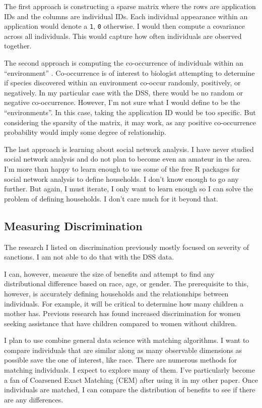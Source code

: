\documentclass[12pt,letterpaperpaper,]{book}
\begin{document}
The first approach is constructing a sparse matrix where the rows are
application IDs and the columns are individual IDs. Each individual
appearance within an application would denote a \texttt{1}, \texttt{0}
otherwise. I would then compute a covariance across all individuals.
This would capture how often individuals are observed together.

The second approach is computing the co-occurrence of individuals within
an ``environment'' \citep{griffith_cooccur:_2015}. Co-occurrence is of
interest to biologist attempting to determine if species discovered
within an environment co-occur randomly, positively, or negatively. In
my particular case with the DSS, there would be no random or negative
co-occurrence. However, I'm not sure what I would define to be the
``environments''. In this case, taking the application ID would be too
specific. But considering the sparsity of the matrix, it may work, as
any positive co-occurrence probability would imply some degree of
relationship.

The last approach is learning about social network analysis. I have
never studied social network analysis and do not plan to become even an
amateur in the area. I'm more than happy to learn enough to use some of
the free R packages for social network analysis to define households. I
don't know enough to go any further. But again, I must iterate, I only
want to learn enough so I can solve the problem of defining households.
I don't care much for it beyond that.

\subsection*{Measuring Discrimination}\label{measuring-discrimination}

The research I listed on discrimination previously mostly focused on
severity of sanctions. I am not able to do that with the DSS data.

I can, however, measure the size of benefits and attempt to find any
distributional difference based on race, age, or gender. The
prerequisite to this, however, is accurately defining households and the
relationships between individuals. For example, it will be critical to
determine how many children a mother has. Previous research has found
increased discrimination for women seeking assistance that have children
compared to women without children.

I plan to use combine general data science with matching algorithms. I
want to compare individuals that are similar along as many observable
dimensions as possible save the one of interest, like race. There are
numerous methods for matching individuals. I expect to explore many of
them. I've particularly become a fan of Coarsened Exact Matching (CEM)
after using it in my other paper. Once individuals are matched, I can
compare the distribution of benefits to see if there are any
differences.
\end{document}

